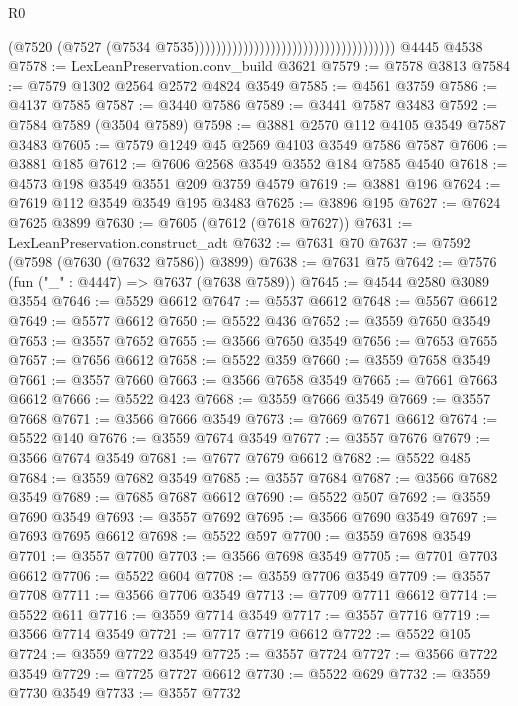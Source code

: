 \begin{lexlean}{R0}
\begin{coremodule}
                                                                        (@7520
                                                                          (@7527
                                                                            (@7534
                                                                              @7535)))))))))))))))))))))))))))))))))))))
    @4445
    @4538
@7578 := LexLeanPreservation.conv_build @3621
@7579 := @7578 @3813
@7584 := @7579 @1302 @2564 @2572 @4824 @3549
@7585 := @4561 @3759
@7586 := @4137 @7585
@7587 := @3440 @7586
@7589 := @3441 @7587 @3483
@7592 := @7584 @7589 (@3504 @7589)
@7598 := @3881 @2570 @112 @4105 @3549 @7587 @3483
@7605 := @7579 @1249 @45 @2569 @4103 @3549 @7586 @7587
@7606 := @3881 @185
@7612 := @7606 @2568 @3549 @3552 @184 @7585 @4540
@7618 := @4573 @198 @3549 @3551 @209 @3759 @4579
@7619 := @3881 @196
@7624 := @7619 @112 @3549 @3549 @195 @3483
@7625 := @3896 @195
@7627 := @7624 @7625 @3899
@7630 := @7605 (@7612 (@7618 @7627))
@7631 := LexLeanPreservation.construct_adt
@7632 := @7631 @70
@7637 := @7592 (@7598 (@7630 (@7632 @7586)) @3899)
@7638 := @7631 @75
@7642 := @7576 (fun ("_" : @4447) => @7637 (@7638 @7589))
@7645 := @4544 @2580 @3089 @3554
@7646 := @5529 @6612
@7647 := @5537 @6612
@7648 := @5567 @6612
@7649 := @5577 @6612
@7650 := @5522 @436
@7652 := @3559 @7650 @3549
@7653 := @3557 @7652
@7655 := @3566 @7650 @3549
@7656 := @7653 @7655
@7657 := @7656 @6612
@7658 := @5522 @359
@7660 := @3559 @7658 @3549
@7661 := @3557 @7660
@7663 := @3566 @7658 @3549
@7665 := @7661 @7663 @6612
@7666 := @5522 @423
@7668 := @3559 @7666 @3549
@7669 := @3557 @7668
@7671 := @3566 @7666 @3549
@7673 := @7669 @7671 @6612
@7674 := @5522 @140
@7676 := @3559 @7674 @3549
@7677 := @3557 @7676
@7679 := @3566 @7674 @3549
@7681 := @7677 @7679 @6612
@7682 := @5522 @485
@7684 := @3559 @7682 @3549
@7685 := @3557 @7684
@7687 := @3566 @7682 @3549
@7689 := @7685 @7687 @6612
@7690 := @5522 @507
@7692 := @3559 @7690 @3549
@7693 := @3557 @7692
@7695 := @3566 @7690 @3549
@7697 := @7693 @7695 @6612
@7698 := @5522 @597
@7700 := @3559 @7698 @3549
@7701 := @3557 @7700
@7703 := @3566 @7698 @3549
@7705 := @7701 @7703 @6612
@7706 := @5522 @604
@7708 := @3559 @7706 @3549
@7709 := @3557 @7708
@7711 := @3566 @7706 @3549
@7713 := @7709 @7711 @6612
@7714 := @5522 @611
@7716 := @3559 @7714 @3549
@7717 := @3557 @7716
@7719 := @3566 @7714 @3549
@7721 := @7717 @7719 @6612
@7722 := @5522 @105
@7724 := @3559 @7722 @3549
@7725 := @3557 @7724
@7727 := @3566 @7722 @3549
@7729 := @7725 @7727 @6612
@7730 := @5522 @629
@7732 := @3559 @7730 @3549
@7733 := @3557 @7732

\end{coremodule}
\end{lexlean}
